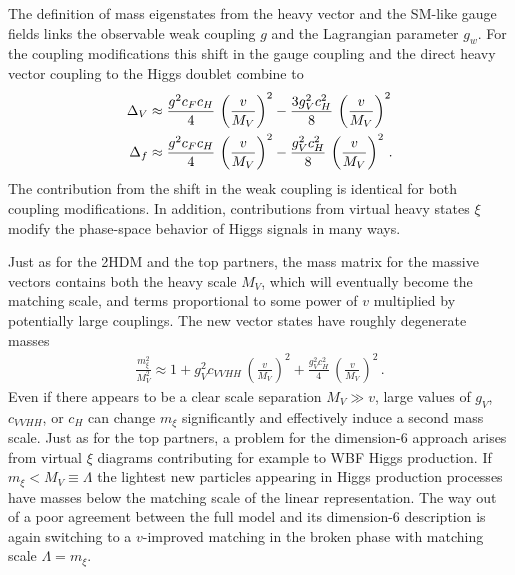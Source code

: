 The definition of mass eigenstates from the heavy vector and the
SM-like gauge fields links the observable weak coupling $g$ and the
Lagrangian parameter $g_w$. For the coupling modifications this shift
in the gauge coupling and the direct heavy vector coupling to the
Higgs doublet combine to
%
\begin{align} \Delta_V &\approx \frac{g^2 c_F c_H}{4} \, \left(
\frac{v}{M_V} \right)^2 - \frac{3 g_V^2 c_H^2}{8} \, \left(
\frac{v}{M_V} \right)^2 \notag \\ \Delta_f &\approx \frac{g^2 c_F
c_H}{4} \, \left( \frac{v}{M_V} \right)^2 - \frac{g_V^2 c_H^2}{8} \,
\left( \frac{v}{M_V} \right)^2 \,.
\label{eq:vector_decoup}
\end{align}
%
The contribution from the shift in the weak coupling is identical for
both coupling modifications.  In addition, contributions from virtual
heavy states $\xi$ modify the phase-space behavior of Higgs signals in
many ways.\medskip

Just as for the 2HDM and the top partners, the mass matrix for the
massive vectors contains both the heavy scale $M_V$, which will
eventually become the matching scale, and terms proportional to some
power of $v$ multiplied by potentially large couplings. The new vector
states have roughly degenerate masses
%
\begin{align} \frac{m_\xi^2}{M_V^2} \approx 1 + g_V^2 c_{VVHH} \,
\left( \frac{v}{M_V} \right)^2 + \frac{g_V^2 c_H^2}{4} \, \left(
\frac{v}{M_V} \right)^2 \,.
  \label{eq:triplet_mxi_M}
\end{align}
%
Even if there appears to be a clear scale separation $M_V \gg v$,
large values of $g_V$, $c_{VVHH}$, or $c_H$ can change $m_\xi$
significantly and effectively induce a second mass scale.  Just as for
the top partners, a problem for the dimension-6 approach arises from
virtual $\xi$ diagrams contributing for example to WBF Higgs
production. If $m_\xi < M_V \equiv \Lambda$ the lightest new particles
appearing in Higgs production processes have masses below the matching
scale of the linear representation.  The way out of a poor agreement
between the full model and its dimension-6 description is again
switching to a $v$-improved matching in the broken phase with matching
scale $\Lambda = m_\xi$.

